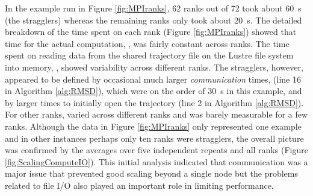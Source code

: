 In the example run in Figure \ref{fig:MPIranks}, 62 ranks out of 72 took about 60~s (the stragglers) whereas the remaining ranks only took about 20~s. 
The detailed breakdown of the time spent on each rank (Figure \ref{fig:MPIranks}) showed that time for the actual computation, \tcomp, was fairly constant across ranks. 
The time spent on reading data from the shared trajectory file on the Lustre file system into memory, \tIO, showed variability across different ranks. 
The stragglers, however, appeared to be defined by occasional much larger \emph{communication} times, \tcomm (line 16 in Algorithm \ref{alg:RMSD}), which were on the order of 30~s in this example, and by larger times to initially open the trajectory (line 2 in Algorithm \ref{alg:RMSD}).
For other ranks, \tcomm varied across different ranks and was barely measurable for a few ranks.
Although the data in Figure \ref{fig:MPIranks} only represented one example and in other instances perhaps only ten ranks were stragglers, the overall picture was confirmed by the averages over five independent repeats and all ranks (Figure \ref{fig:ScalingComputeIO}).
This initial analysis indicated that communication was a major issue that prevented good scaling beyond a single node but the problems related to file I/O also played an important role in limiting performance.

